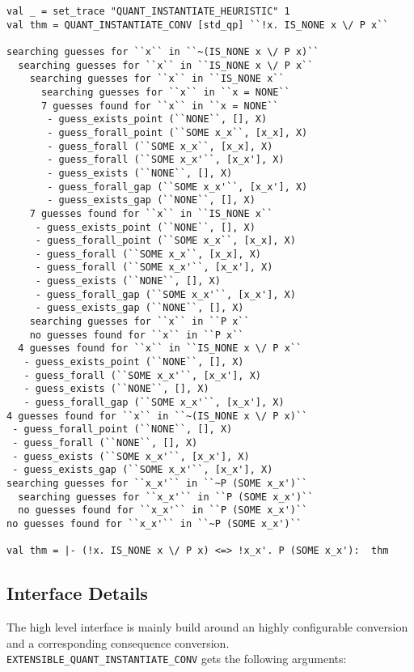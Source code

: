 \documentclass[a4paper,12pt,DIV=12,oneside]{scrbook}
\theoremstyle{definition}
\theoremstyle{remark}
\begin{document}
{\scriptsize
\begin{verbatim}
val _ = set_trace "QUANT_INSTANTIATE_HEURISTIC" 1
val thm = QUANT_INSTANTIATE_CONV [std_qp] ``!x. IS_NONE x \/ P x``

searching guesses for ``x`` in ``~(IS_NONE x \/ P x)``
  searching guesses for ``x`` in ``IS_NONE x \/ P x``
    searching guesses for ``x`` in ``IS_NONE x``
      searching guesses for ``x`` in ``x = NONE``
      7 guesses found for ``x`` in ``x = NONE``
       - guess_exists_point (``NONE``, [], X)
       - guess_forall_point (``SOME x_x``, [x_x], X)
       - guess_forall (``SOME x_x``, [x_x], X)
       - guess_forall (``SOME x_x'``, [x_x'], X)
       - guess_exists (``NONE``, [], X)
       - guess_forall_gap (``SOME x_x'``, [x_x'], X)
       - guess_exists_gap (``NONE``, [], X)
    7 guesses found for ``x`` in ``IS_NONE x``
     - guess_exists_point (``NONE``, [], X)
     - guess_forall_point (``SOME x_x``, [x_x], X)
     - guess_forall (``SOME x_x``, [x_x], X)
     - guess_forall (``SOME x_x'``, [x_x'], X)
     - guess_exists (``NONE``, [], X)
     - guess_forall_gap (``SOME x_x'``, [x_x'], X)
     - guess_exists_gap (``NONE``, [], X)
    searching guesses for ``x`` in ``P x``
    no guesses found for ``x`` in ``P x``
  4 guesses found for ``x`` in ``IS_NONE x \/ P x``
   - guess_exists_point (``NONE``, [], X)
   - guess_forall (``SOME x_x'``, [x_x'], X)
   - guess_exists (``NONE``, [], X)
   - guess_forall_gap (``SOME x_x'``, [x_x'], X)
4 guesses found for ``x`` in ``~(IS_NONE x \/ P x)``
 - guess_forall_point (``NONE``, [], X)
 - guess_forall (``NONE``, [], X)
 - guess_exists (``SOME x_x'``, [x_x'], X)
 - guess_exists_gap (``SOME x_x'``, [x_x'], X)
searching guesses for ``x_x'`` in ``~P (SOME x_x')``
  searching guesses for ``x_x'`` in ``P (SOME x_x')``
  no guesses found for ``x_x'`` in ``P (SOME x_x')``
no guesses found for ``x_x'`` in ``~P (SOME x_x')``

val thm = |- (!x. IS_NONE x \/ P x) <=> !x_x'. P (SOME x_x'):  thm
\end{verbatim}}


\subsection{Interface Details}

The high level interface is mainly build around
an highly configurable conversion and a corresponding consequence conversion.
\texttt{EXTENSIBLE\_QUANT\_INSTANTIATE\_CONV} gets the following arguments:
\end{document}
